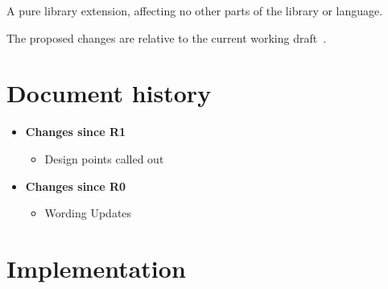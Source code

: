 \documentclass[a4paper,10pt,oneside,openany,final,article]{memoir}
\begin{document}
A pure library extension, affecting no other parts of the library or language.

The proposed changes are relative to the current working draft~\cite{N4910}.

\chapter*{Document history}

\begin{itemize}
\item \textbf{Changes since R1}
  \begin{itemize}
  \item Design points called out
  \end{itemize}
\item \textbf{Changes since R0}
  \begin{itemize}
  \item Wording Updates
  \end{itemize}
\end{itemize}

\renewcommand{\bibname}{References}



\chapter*{Implementation}
\end{document}

